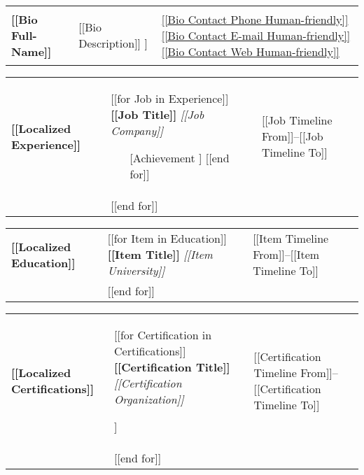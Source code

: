 \documentclass[11pt, a4paper]{article}
\begin{document}
\begin{tabularx}{\textwidth}{m{50mm} m{95mm} m{50mm}}
    {\huge\textbf{[[Bio Full-Name]]}} \newline &
    \begin{center}
    [[Bio Description]] \newline
    [[Bio Location]] \newline
    \end{center} &
    {\small \href{[[Bio Contact Phone URI]]}{[[Bio Contact Phone Human-friendly]]}} \newline
    {\small \href{[[Bio Contact E-mail URI]]}{[[Bio Contact E-mail Human-friendly]]}} \newline
    {\small \href{[[Bio Contact Web URI]]}{[[Bio Contact Web Human-friendly]]}} \newline
\end{tabularx}

\begin{tabularx}{\textwidth}{p{20mm} p{125mm} p{50mm}}
    \textbf{[[Localized Experience]]} &
    [[for Job in Experience]]
        \textbf{[[Job Title]]} \newline
        \textit{[[Job Company]]}
        \begin{itemize}[leftmargin=*]
        [[for Achievement in Job Achievements]]
            \item [[Achievement]]
        [[end for]]
        \end{itemize} &
        {\small [[Job Timeline From]]--[[Job Timeline To]]} \\ &
    [[end for]]
\end{tabularx}

\begin{tabularx}{\textwidth}{p{20mm} p{125mm} p{50mm}}
    \textbf{[[Localized Education]]} &
    [[for Item in Education]]
        \textbf{[[Item Title]]} \newline
        \textit{[[Item University]]} \newline &
        {\small [[Item Timeline From]]--[[Item Timeline To]]} \\ &
    [[end for]]
\end{tabularx}

\begin{tabularx}{\textwidth}{p{20mm} p{125mm} p{50mm}}
    \textbf{[[Localized Certifications]]} &
    [[for Certification in Certifications]]
        \textbf{[[Certification Title]]} \newline
        \textit{[[Certification Organization]]}
        \begin{flushleft}
        [[Certification Description]]
        \end{flushleft} &
        {\small [[Certification Timeline From]]--[[Certification Timeline To]]} \\ &
    [[end for]]
\end{tabularx}
\end{document}
